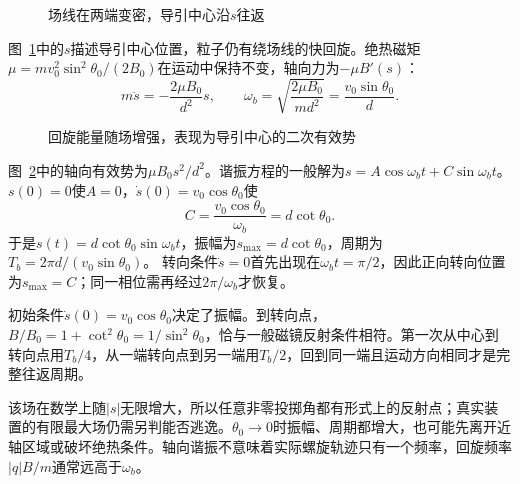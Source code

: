 \begin{figure}[H]\centering
{}
\caption{场线在两端变密，导引中心沿$s$往返}\label{fig:i3-e17-q}
\end{figure}
\begin{solution}
图~\ref{fig:i3-e17-q}中的$s$描述导引中心位置，粒子仍有绕场线的快回旋。绝热磁矩$\mu=mv_0^2\sin^2\theta_0/(2B_0)$在运动中保持不变，轴向力为$-\mu B'(s)$：
\[
m\ddot s=-\frac{2\mu B_0}{d^2}s,\qquad
\omega_b=\sqrt{\frac{2\mu B_0}{md^2}}=\frac{v_0\sin\theta_0}{d}.
\]

\begin{figure}[H]\centering
{}
\caption{回旋能量随场增强，表现为导引中心的二次有效势}\label{fig:i3-e17-s}
\end{figure}

图~\ref{fig:i3-e17-s}中的轴向有效势为$\mu B_0s^2/d^2$。谐振方程的一般解为$s=A\cos\omega_bt+C\sin\omega_bt$。$s(0)=0$使$A=0$，$\dot s(0)=v_0\cos\theta_0$使
\[
C=\frac{v_0\cos\theta_0}{\omega_b}=d\cot\theta_0.
\]
于是$s(t)=d\cot\theta_0\sin\omega_bt$，振幅为$s_{\max}=d\cot\theta_0$，周期为$\boxed{T_b=2\pi d/(v_0\sin\theta_0)}$。
转向条件$\dot s=0$首先出现在$\omega_bt=\pi/2$，因此正向转向位置为$s_{\max}=C$；同一相位需再经过$2\pi/\omega_b$才恢复。

初始条件$\dot s(0)=v_0\cos\theta_0$决定了振幅。到转向点，$B/B_0=1+\cot^2\theta_0=1/\sin^2\theta_0$，恰与一般磁镜反射条件相符。第一次从中心到转向点用$T_b/4$，从一端转向点到另一端用$T_b/2$，回到同一端且运动方向相同才是完整往返周期。

该场在数学上随$|s|$无限增大，所以任意非零投掷角都有形式上的反射点；真实装置的有限最大场仍需另判能否逃逸。$\theta_0\to0$时振幅、周期都增大，也可能先离开近轴区域或破坏绝热条件。轴向谐振不意味着实际螺旋轨迹只有一个频率，回旋频率$|q|B/m$通常远高于$\omega_b$。
\end{solution}

